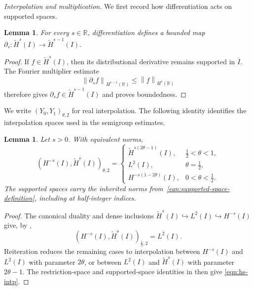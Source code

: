 \documentclass[11pt,reqno]{amsart}
\theoremstyle{plain}
\newtheorem{lemma}[theorem]{Lemma}
\theoremstyle{definition}
\numberwithin{equation}{section}
\newcommand{\paren}[1]{\left(#1\right)}
\newcommand{\p}{\partial}
\newcommand{\wt}[1]{\widetilde{#1}}
\newcommand{\norm}[1]{\left\lVert #1 \right\rVert}
\newcommand{\R}{\mathbb{R}}
\newcommand{\hi}[1]{H^{#1}(I)}
\newcommand{\thi}[1]{\wt H^{#1}(I)}
\begin{document}
\emph{Interpolation and multiplication.}
We first record how differentiation acts on supported spaces.

\begin{lemma}\label{lem:wt-der}
For every $s\in\R$, differentiation defines a bounded map $\p_s:\wt H^s(I)\to\wt H^{s-1}(I).$
\end{lemma}
\begin{proof}
If $f\in\wt H^s(I)$, then its distributional derivative remains supported
in $\overline I$. The Fourier multiplier estimate
\begin{equation}
    \norm{\p_s f}_{H^{s-1}(\R)} \le \norm{f}_{H^s(\R)}
\end{equation}
therefore gives $\p_s f\in\wt H^{s-1}(I)$ and proves boundedness.
\end{proof}

We write $(Y_0,Y_1)_{\theta,2}$ for real interpolation. The following
identity identifies the interpolation spaces used in the semigroup estimates.

\begin{lemma}\label{lem:hs-intp}
Let $s>0$. With equivalent norms,
\begin{equation}\label{eqn:hs-intp}
    \paren{\hi{-s},\thi{s}}_{\theta,2}
    =
    \begin{cases}
        \thi{s(2\theta-1)}, & \frac12<\theta<1,\\
        L^2(I), & \theta=\frac12,\\
        \hi{-s(1-2\theta)}, & 0<\theta<\frac12.
    \end{cases}
\end{equation}
The supported spaces carry the inherited norms from~\eqref{eqn:supported-space-definition}, including at half-integer indices.
\end{lemma}
\begin{proof}
The canonical duality and dense inclusions
$\thi{s}\hookrightarrow L^2(I)\hookrightarrow\hi{-s}$ give, by
\cite[Lemma~B.10]{McLean2000},
\begin{equation*}
    \paren{\hi{-s},\thi{s}}_{\frac12,2}=L^2(I).
\end{equation*}
Reiteration \cite[Theorem~B.6]{McLean2000} reduces the remaining cases
to interpolation between $H^{-s}(I)$ and $L^2(I)$ with parameter
$2\theta$, or between $L^2(I)$ and $\wt H^s(I)$ with parameter
$2\theta-1$. The restriction-space and supported-space identities in
\cite[Theorems~B.8 and~B.9]{McLean2000} then give \eqref{eqn:hs-intp}.
\end{proof}
\end{document}
